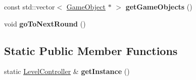 \begin{DoxyCompactItemize}
\item 
\hypertarget{class_level_controller_a331dc36b48234e99d07a6db68e700297}{const std\+::vector$<$ \hyperlink{class_game_object}{Game\+Object} $\ast$ $>$ {\bfseries get\+Game\+Objects} ()}\label{class_level_controller_a331dc36b48234e99d07a6db68e700297}

\item 
\hypertarget{class_level_controller_a77c7be37cbb30dc3ff6574c053562260}{void {\bfseries go\+To\+Next\+Round} ()}\label{class_level_controller_a77c7be37cbb30dc3ff6574c053562260}

\end{DoxyCompactItemize}
\subsection*{Static Public Member Functions}
\begin{DoxyCompactItemize}
\item 
\hypertarget{class_level_controller_aff1d9aba9f9fb043e644cc4c01869b7f}{static \hyperlink{class_level_controller}{Level\+Controller} \& {\bfseries get\+Instance} ()}\label{class_level_controller_aff1d9aba9f9fb043e644cc4c01869b7f}

\end{DoxyCompactItemize}
